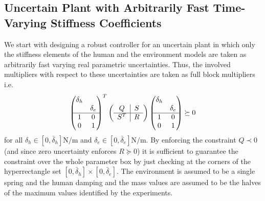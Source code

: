 \subsection{Uncertain Plant with Arbitrarily Fast Time-Varying Stiffness Coefficients}

We start with designing a robust controller for an uncertain plant in which only the stiffness elements of the
human and the environment models are taken as arbitrarily fast varying real parametric uncertainties. Thus, the
involved multipliers with respect to these uncertainties are taken as full block multipliers i.e. 
\[
\begin{pmatrix}\delta_h &\\ &\delta_e\\\hline 1 &0\\0&1\end{pmatrix}^T
\left(
\begin{array}{c|c}
	Q &S\\\hline S^T &R
\end{array}
\right)
\begin{pmatrix}\delta_h &\\ &\delta_e\\\hline 1 &0\\0&1\end{pmatrix} \succeq 0
\]
for all $\delta_h\in[0,\bar{\delta}_h]\si{\newton\per\meter}$ and $\delta_e\in[0,\bar{\delta}_e]\si{\newton\per\meter}$. 
By enforcing the constraint $Q\prec 0$ (and since zero uncertainty enforces $R\succeq 0$) it is sufficient to guarantee the 
constraint over the whole parameter box by just checking at the corners of the hyperrectangle set $[0,\bar{\delta}_h]\times
[0,\bar{\delta}_e]$. The environment is assumed to be a single spring and the human damping and the mass values are assumed 
to be the halves of the maximum values identified by the experiments.

\designonedata

